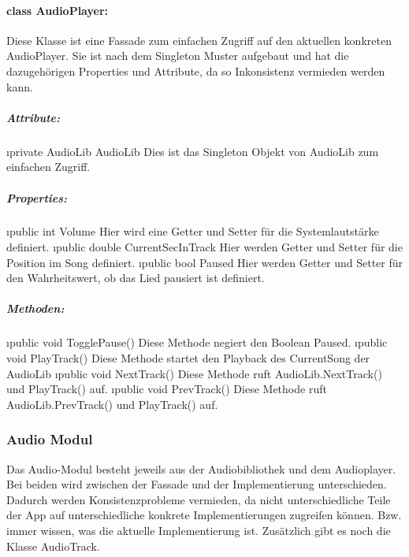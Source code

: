 \documentclass[../entwurf.tex]{subfiles}
\begin{document}
			\paragraph{class AudioPlayer:}
				Diese Klasse ist eine Fassade zum einfachen Zugriff auf den aktuellen konkreten AudioPlayer. 
				Sie ist nach dem Singleton Muster aufgebaut und hat die dazugehörigen Properties und Attribute, 
				da so Inkonsistenz vermieden werden kann. 
				\subparagraph{Attribute:}
					\begin{itemize}
						\i{private AudioLib AudioLib} Dies ist das Singleton Objekt von AudioLib zum einfachen Zugriff.
					\end{itemize}
				\subparagraph{Properties:}
					\begin{itemize}
						\i{public int Volume} Hier wird eine Getter und Setter für die Systemlautstärke definiert.
						\i{public double CurrentSecInTrack} Hier werden Getter und Setter für die Position im Song definiert.
						\i{public bool Paused} Hier werden Getter und Setter für den Wahrheitswert, ob das Lied pausiert ist definiert.
					\end{itemize}
				\subparagraph{Methoden:}
					\begin{itemize}
						\i{public void TogglePause()} Diese Methode negiert den Boolean Paused.
						\i{public void PlayTrack()} Diese Methode startet den Playback des CurrentSong der AudioLib
						\i{public void NextTrack()} Diese Methode ruft AudioLib.NextTrack() und PlayTrack() auf.
						\i{public void PrevTrack()} Diese Methode ruft AudioLib.PrevTrack() und PlayTrack() auf.
					\end{itemize}
		\subsubsection{Audio Modul}
			Das Audio-Modul besteht jeweils aus der Audiobibliothek und dem Audioplayer.
			Bei beiden wird zwischen der Fassade und der Implementierung unterschieden.
			Dadurch werden Konsistenzprobleme vermieden, da nicht unterschiedliche Teile der App auf unterschiedliche konkrete Implementierungen
			zugreifen können. Bzw. immer wissen, was die aktuelle Implementierung ist.
			Zusätzlich gibt es noch die Klasse AudioTrack.
\end{document}
